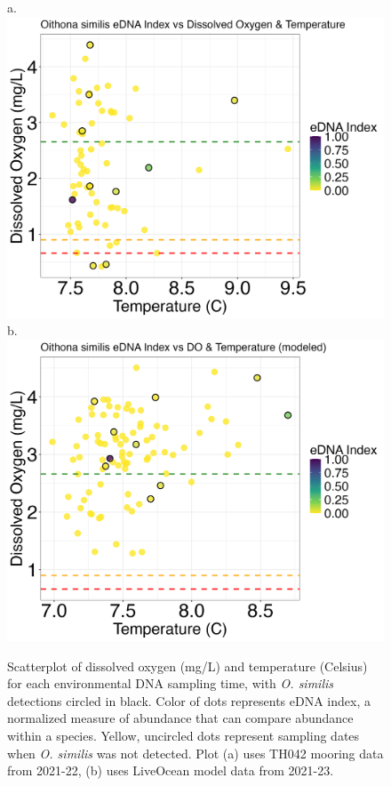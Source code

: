 \documentclass[12pt,twoside]{reedthesis}
\begin{document}
	\begin{figure}[!h]
		\begin{center}
			a. \includegraphics[scale=0.3]{Osimilis_Scatter_noOut}
			b. \includegraphics[scale=0.3]{Osimilis_Scatter_AllYr_mod_noOut}
			\caption[\textit{O. similis} scatterplot]{\footnotesize{Scatterplot of dissolved oxygen (mg/L) and temperature (Celsius) for each environmental DNA sampling time, with \textit{O. similis} detections circled in black. Color of dots represents eDNA index, a normalized measure of abundance that can compare abundance within a species. Yellow, uncircled dots represent sampling dates when \textit{O. similis} was not detected. Plot (a) uses TH042 mooring data from 2021-22, (b) uses LiveOcean model data from 2021-23.}} %
			\label{OsimilisScatter}
		\end{center}
	\end{figure} 
	
\end{document}
